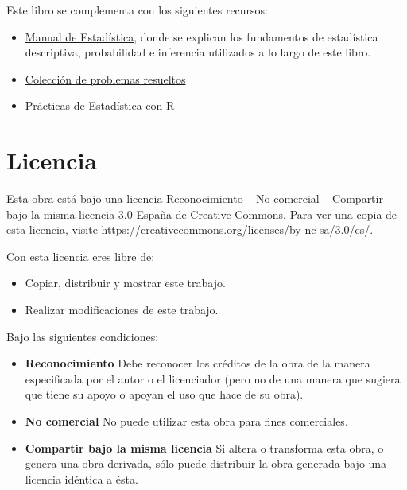 \documentclass[
  spanish,
  a4paper,
]{scrreport}
\providecommand{\tightlist}{%
  \setlength{\itemsep}{0pt}\setlength{\parskip}{0pt}}
\theoremstyle{definition}
\theoremstyle{definition}
\theoremstyle{remark}
\begin{document}
Este libro se complementa con los siguientes recursos:

\begin{itemize}
\tightlist
\item
  \href{https://aprendeconalf.es/estadistica-manual/}{Manual de
  Estadística}, donde se explican los fundamentos de estadística
  descriptiva, probabilidad e inferencia utilizados a lo largo de este
  libro.
\item
  \href{https://aprendeconalf.es/estadistica-ejercicios/}{Colección de
  problemas resueltos}
\item
  \href{https://aprendeconalf.es/estadistica-practicas-r/}{Prácticas de
  Estadística con R}
\end{itemize}

\section*{Licencia}\label{licencia}


Esta obra está bajo una licencia Reconocimiento -- No comercial --
Compartir bajo la misma licencia 3.0 España de Creative Commons. Para
ver una copia de esta licencia, visite
\url{https://creativecommons.org/licenses/by-nc-sa/3.0/es/}.

Con esta licencia eres libre de:

\begin{itemize}
\tightlist
\item
  Copiar, distribuir y mostrar este trabajo.
\item
  Realizar modificaciones de este trabajo.
\end{itemize}

Bajo las siguientes condiciones:

\begin{itemize}
\item
  \textbf{Reconocimiento} Debe reconocer los créditos de la obra de la
  manera especificada por el autor o el licenciador (pero no de una
  manera que sugiera que tiene su apoyo o apoyan el uso que hace de su
  obra).
\item
  \textbf{No comercial} No puede utilizar esta obra para fines
  comerciales.
\item
  \textbf{Compartir bajo la misma licencia} Si altera o transforma esta
  obra, o genera una obra derivada, sólo puede distribuir la obra
  generada bajo una licencia idéntica a ésta.
\end{itemize}
\end{document}

